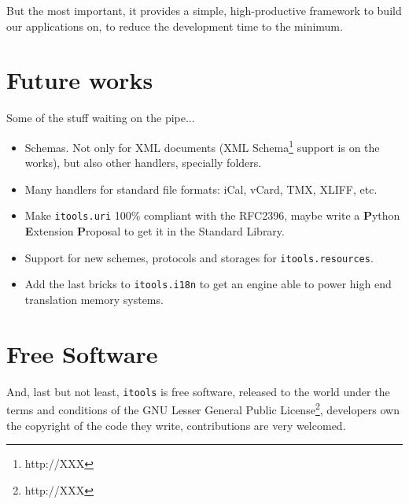 But the most important, it provides a simple, high-productive framework
to build our applications on, to reduce the development time to the
minimum.

\section{Future works}

Some of the stuff waiting on the pipe...

\begin{itemize}
  \item Schemas. Not only for XML documents (XML Schema\footnote{http://XXX}
    support is on the works), but also other handlers, specially folders.

  \item Many handlers for standard file formats: iCal, vCard, TMX, XLIFF, etc.

  \item Make {\tt itools.uri} 100\% compliant with the RFC2396,
    maybe write a {\bf P}ython {\bf E}xtension {\bf P}roposal to
    get it in the Standard Library.

  \item Support for new schemes, protocols and storages for
    {\tt itools.resources}.

  \item Add the last bricks to {\tt itools.i18n} to get an engine able
    to power high end translation memory systems.
\end{itemize}


\section{Free Software}

And, last but not least, {\tt itools} is free software, released to the
world under the terms and conditions of the GNU Lesser General Public
License\footnote{http://XXX}, developers own the copyright of the code
they write, contributions are very welcomed.

